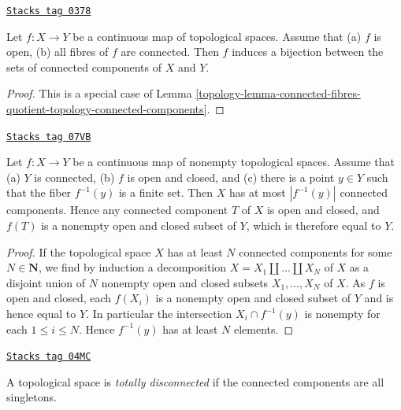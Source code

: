 \begin{lemma}
\label{topology-lemma-connected-fibres-connected-components}
\href{https://stacks.math.columbia.edu/tag/0378}{\texttt{Stacks tag 0378}}

Let $f : X \to Y$ be a continuous map of topological spaces.
Assume that
(a) $f$ is open,
(b) all fibres of $f$ are connected.
Then $f$ induces a bijection between the sets of connected
components of $X$ and $Y$.
\end{lemma}

\begin{proof}

This is a special case of
Lemma \ref{topology-lemma-connected-fibres-quotient-topology-connected-components}.
\end{proof}

\begin{lemma}
\label{topology-lemma-finite-fibre-connected-components}
\href{https://stacks.math.columbia.edu/tag/07VB}{\texttt{Stacks tag 07VB}}

Let $f : X \to Y$ be a continuous map of nonempty topological spaces. Assume
that
(a) $Y$ is connected,
(b) $f$ is open and closed, and
(c) there is a point $y\in Y$ such that the fiber $f^{-1}(y)$ is a finite set.
Then $X$ has at most $|f^{-1}(y)|$ connected components. Hence any connected
component $T$ of $X$ is open and closed, and $f(T)$ is a nonempty open and
closed subset of $Y$, which is therefore equal to $Y$.
\end{lemma}

\begin{proof}
If the topological space $X$ has at least $N$ connected components for some
$N \in \mathbf{N}$, we find by induction a decomposition
$X = X_1 \amalg \ldots \amalg X_N$ of $X$ as a disjoint union of $N$ nonempty
open and closed subsets $X_1, \ldots , X_N$ of $X$. As $f$ is open and closed,
each $f(X_i)$ is a nonempty open and closed subset of $Y$ and is hence equal to
$Y$. In particular the intersection $X_i \cap f^{-1}(y)$ is nonempty for each
$1 \leq i \leq N$. Hence $f^{-1}(y)$ has at least $N$ elements.
\end{proof}

\begin{definition}
\label{topology-definition-totally-disconnected}
\href{https://stacks.math.columbia.edu/tag/04MC}{\texttt{Stacks tag 04MC}}

A topological space is {\it totally disconnected} if the connected components
are all singletons.
\end{definition}


